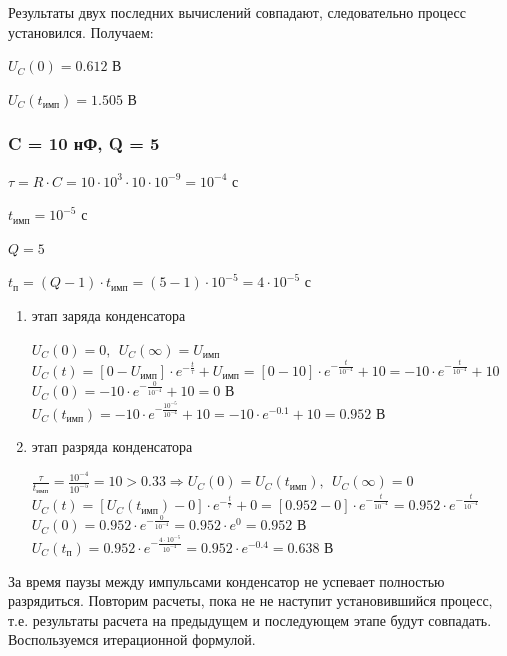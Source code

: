 Результаты двух последних вычислений совпадают, следовательно процесс установился. Получаем:
	
$U_C(0) = 0.612 \text{ В}$
	
$U_C(t_\text{имп}) = 1.505 \text{ В}$
	
\subsubsection{C = 10 нФ, Q = 5}

$\tau = R \cdot C = 10 \cdot 10^3 \cdot 10 \cdot 10^{-9} = 10^{-4} \text{ с}$

$t_\text{имп} = 10^{-5} \text{ с}$

$Q = 5$		

$t_\text{п} = (Q - 1) \cdot t_\text{имп} = (5 - 1) \cdot 10^{-5} = 4 \cdot 10^{-5} \text{ с}$
			
\begin{enumerate}
\item этап заряда конденсатора

	$U_C(0) = 0,\ \ U_C(\infty) = U_\text{имп}$\\	
	$U_C(t) = [0 - U_\text{имп}] \cdot e^{-\frac{t}{\tau}} + U_\text{имп} = [0 - 10] \cdot e^{-\frac{t}{10^{-4}}} + 10 = -10 \cdot e^{-\frac{t}{10^{-4}}} + 10$\\
	$U_C(0) = -10 \cdot e^{-\frac{0}{10^{-4}}} + 10 = 0 \text{ В}$\\
	$U_C(t_\text{имп}) = -10 \cdot e^{-\frac{10^{-5}}{10^{-4}}} + 10 = -10 \cdot e^{-0.1} + 10 = 0.952 \text{ В}$
	
\item этап разряда конденсатора

	$\frac{\tau}{t_\text{имп}} = \frac{10^{-4}}{10^{-5}} = 10 > 0.33 \Rightarrow U_C(0) = U_C(t_\text{имп}),\ \ U_C(\infty) = 0$\\
	$U_C(t) = [U_C(t_\text{имп}) - 0] \cdot e^{-\frac{t}{\tau}} + 0 =  [0.952 - 0] \cdot e^{-\frac{t}{10^{-4}}} = 0.952 \cdot e^{-\frac{t}{10^{-4}}}$\\
	$U_C(0) = 0.952 \cdot e^{-\frac{0}{10^{-4}}} = 0.952 \cdot e^0 = 0.952 \text{ В}$\\
	$U_C(t_\text{п}) = 0.952 \cdot e^{-\frac{4 \cdot 10^{-5}}{10^{-4}}} = 0.952 \cdot e^{-0.4} = 0.638 \text{ В}$
\end{enumerate}				
		
За время паузы между импульсами конденсатор не успевает полностью разрядиться. Повторим расчеты, пока не не наступит установившийся процесс, т.е. результаты расчета на предыдущем и последующем этапе будут совпадать.	Воспользуемся итерационной формулой.

